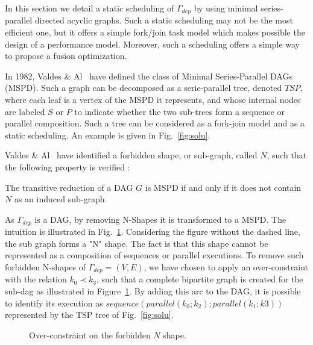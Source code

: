 In this section we detail a static scheduling of $\Gamma_{dep}$ by using minimal series-parallel directed acyclic graphs. Such a static scheduling may not be the most efficient one, but it offers a simple fork/join task model which makes possible the design of a performance model. Moreover, such a scheduling offers a simple way to propose a fusion optimization. 

In 1982, Valdes \& Al~\cite{Valdes:1979:RSP:800135.804393} have defined the class of Minimal Series-Parallel DAGs (MSPD). Such a graph can be decomposed as a serie-parallel tree, denoted $TSP$, where each leaf is a vertex of the MSPD it represents, and whose internal nodes are labeled $S$ or $P$ to indicate whether the two sub-trees form a sequence or parallel composition. Such a tree can be considered as a fork-join model and as a static scheduling. An example is given in Fig.~\ref{fig:solu}.

Valdes \& Al~\cite{Valdes:1979:RSP:800135.804393} have identified a forbidden shape, or sub-graph, called $N$, such that the following property is verified :

\begin{myth}
The transitive reduction of a DAG $G$ is MSPD if and only if it does not contain $N$ as an induced sub-graph.
\end{myth}

As $\Gamma_{dep}$ is a DAG, by removing N-Shapes it is transformed to a MSPD. The intuition is illustrated in Fig.~\ref{fig:over}. Considering the figure without the dashed line, the sub graph forms a "N" shape. The fact is that this shape cannot be represented as a composition of sequences or parallel executions.
To remove such forbidden N-shapes of $\Gamma_{dep}=(V,E)$, we have chosen to apply an over-constraint with the relation $k_0 \prec k_3$, such that a complete bipartite graph is created for the sub-dag as illustrated in Figure~\ref{fig:over}. By adding this arc to the DAG, it is possible to identify its execution as $sequence(parallel(k_0;k_2);parallel(k_1;k3))$ represented by the TSP tree of Fig.~\ref{fig:solu}.

\begin{figure}[h!]
\begin{center}
\caption{Over-constraint on the forbidden $N$ shape.}
\label{fig:over}
\end{center}
\end{figure}

